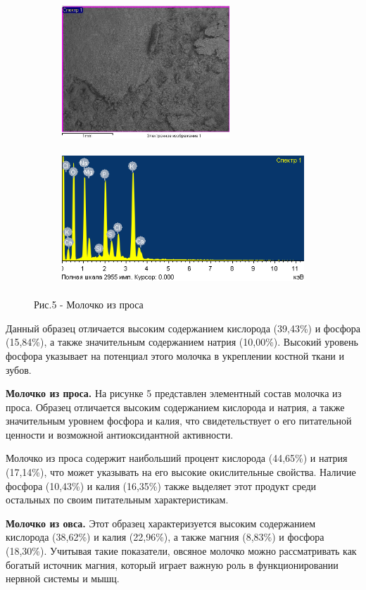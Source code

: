 \begin{figure}[H]
	\centering
	\begin{subfigure}{0.4\textwidth}
		\centering
		\includegraphics[height=5cm]{media/pish/image52}
	\end{subfigure}
	\hfill
	\begin{subfigure}{0.55\textwidth}
		\centering
		\includegraphics[height=5cm]{media/pish/image53}
	\end{subfigure}
	\caption*{Рис.5 - Молочко из проса}
\end{figure}

\begin{multicols}{2}
Данный образец отличается высоким содержанием кислорода (39,43\%) и фосфора
(15,84\%), а также значительным содержанием натрия (10,00\%). Высокий
уровень фосфора указывает на потенциал этого молочка в укреплении
костной ткани и зубов.

{\bfseries Молочко из проса.} На рисунке 5 представлен элементный состав
молочка из проса. Образец отличается высоким содержанием кислорода и
натрия, а также значительным уровнем фосфора и калия, что
свидетельствует о его питательной ценности и возможной антиоксидантной
активности.

Молочко из проса содержит наибольший процент кислорода (44,65\%) и
натрия (17,14\%), что может указывать на его высокие окислительные
свойства. Наличие фосфора (10,43\%) и калия (16,35\%) также выделяет
этот продукт среди остальных по своим питательным характеристикам.

{\bfseries Молочко из овса.} Этот образец характеризуется высоким
содержанием кислорода (38,62\%) и калия (22,96\%), а также магния
(8,83\%) и фосфора (18,30\%). Учитывая такие показатели, овсяное молочко
можно рассматривать как богатый источник магния, который играет важную
роль в функционировании нервной системы и мышц.
\end{multicols}

